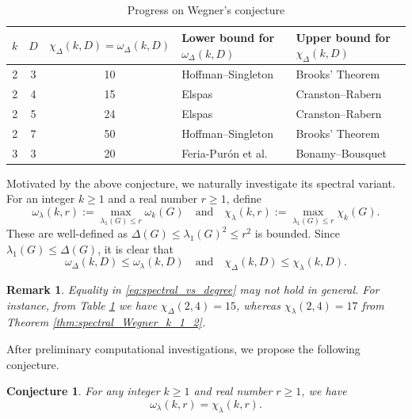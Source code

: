 \documentclass[10pt,a4paper]{article}
\theoremstyle{plain}
\newtheorem{conjecture}[theorem]{Conjecture}
\newtheorem*{remark}{Remark}
\numberwithin{equation}{section}
\begin{document}
\begin{table}[ht]
    \centering
    \begin{tabular}{c c c l l}
    \hline
  $k$ &  $D$ & $\chi_\Delta(k,D) =\omega_\Delta(k,D)$ & Lower bound for $\omega_\Delta(k,D)$ & Upper bound for $\chi_\Delta(k,D)$\\
  \hline
   2 & 3 & 10 & Hoffman--Singleton \cite{Hoffman_Singleton_1960} & Brooks' Theorem\\ 
   2 & 4 & 15 & Elspas \cite{Elspas_1964} & Cranston--Rabern \cite{Cranston_Rabern_2016} \\
   2 & 5 & 24 & Elspas \cite{Elspas_1964} & Cranston--Rabern \cite{Cranston_Rabern_2016} \\
   2 & 7 & 50 & Hoffman--Singleton \cite{Hoffman_Singleton_1960} & Brooks' Theorem\\
   3 & 3 & 20 & Feria-Pur\'{o}n et al. \cite{Puron_Miller_Guillermo_2011} & Bonamy--Bousquet \cite{Bonamy_Bousquet_2014} \\
   \hline
\end{tabular}
    \caption{Progress on Wegner's conjecture}
    \label{table:Wegner}
\end{table}

Motivated by the above conjecture, we naturally investigate its spectral variant. For an integer $k\ge  1$ and a real number $r\ge 1$, define 
\[ \omega_\lambda(k,r):= \max_{\lambda_1(G)\le r}\omega_k(G)\quad \text{and}\quad \chi_\lambda(k,r):= \max_{\lambda_1(G)\le r}\chi_k(G).\]
These are well-defined as $\Delta(G)\le \lambda_1(G)^2 \le r^2$ is bounded. Since $\lambda_1(G)\le \Delta(G)$, it is clear that 
\begin{equation}\label{eq:spectral_vs_degree}
   \omega_\Delta(k,D)\le \omega_\lambda(k,D)\quad \text{and}\quad \chi_\Delta(k,D)\le \chi_\lambda(k,D). 
\end{equation}

\begin{remark}
    Equality in \eqref{eq:spectral_vs_degree} may not hold in general. For instance, from Table \ref{table:Wegner} we have $\chi_\Delta(2,4) = 15$, whereas $\chi_\lambda(2,4) = 17$ from Theorem \ref{thm:spectral_Wegner_k_1_2}. 
\end{remark}

After preliminary computational investigations, we propose the following conjecture.

\begin{conjecture}\label{conj:spectraL_Wegner} For any integer $k\ge 1$ and real number $r\ge 1$, we have 
\[ \omega_\lambda(k,r) = \chi_\lambda(k,r).\]
\end{conjecture}
\end{document}
